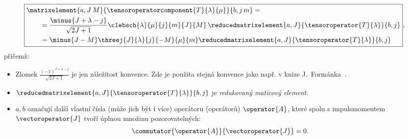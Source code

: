 	\begin{equation}
		\label{eq:WignerEckart}
		\boxed{
			\begin{aligned}
			&\matrixelement{a,J\,M}{\tensoroperatorcomponent{T}{\lambda}{\mu}}{b,j\,m}=\\
			&\qquad=\frac{\minus{J+\lambda-j}}{\sqrt{2J+1}}
				\clebsch{\lambda}{\mu}{j}{m}{J}{M}\,\reducedmatrixelement{a,J}{\tensoroperator{T}{\lambda}}{b,j}\\
			&\qquad=\minus{J-M}\threej{J}{\lambda}{j}{-M}{\mu}{m}\reducedmatrixelement{a,J}{\tensoroperator{T}{\lambda}}{b,j}
			\end{aligned}
		},
	\end{equation}
	přičemž:
	\begin{itemize}
	\item
		Zlomek $\frac{(-1)^{J+\lambda-j}}{\sqrt{2J+1}}$ je jen záležitost konvence.
		Zde je použita stejná konvence jako např. v knize J.~Formánka~\cite{Formanek2004}.	
	
	\item 
		$\reducedmatrixelement{a,J}{\tensoroperator{T}{\lambda}}{b,j}$ je \emph{redukovaný maticový element}.

	\item 
		$a,b$ označují další vlastní čísla (může jich být i více) operátoru (operátorů) $\operator{A}$,	které spolu s impulsmomentem $\vectoroperator{J}$ tvoří úplnou množinu pozorovatelných:
		\begin{equation}
			\commutator{\operator{A}}{\vectoroperator{J}}=0.
		\end{equation}


\end{itemize}
